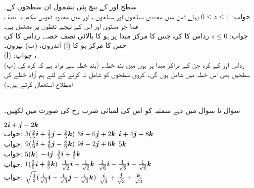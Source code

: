 سطح  اور  کے بیچ پٹی بشمول ان سطحوں کے۔\\
جواب:\quad
$0\le z\le 1$
پہلے ثمن میں محددی سطحوں اور سطحوں ،  اور  میں محدود ٹھوس مکعب۔
نصف فضا جو مستوی  اور اس کے نیچے  نقطوں پر مشتمل ہے۔ \\
جواب:\quad
$z\le 0$
رداس  کا کرہ جس کا مرکز مبدا پر ہو کا بالائی نصف حصہ۔
رداس  کا کرہ جس کا مرکز  ہو کا (ا) اندرون، (ب) بیرون۔\\
جواب:\quad
(ا) ، \\
(ب) 
رداس  اور  کے کرہ جن کے مراکز مبدا پر ہوں میں بند خطہ۔ (بند خطہ سے مراد ہے کہ کرہ کی سطحیں بھی اس خطہ میں شامل ہوں گی۔ کروی سطحوں کو شامل نہ کرنے کے لئے ہم آزاد خطے کی اصطلاح استعمال کرتے ہیں۔)

\\
سوال  تا سوال  میں دیے سمتیہ کو اس کی لمبائی ضرب رخ کی صورت میں لکھیں۔

$2{\boldsymbol{i}}+{\boldsymbol{j}}-2{\boldsymbol{k}}$\\
جواب:\quad
$3(\tfrac{2}{3}{\boldsymbol{i}}+\tfrac{1}{3}{\boldsymbol{j}}-\tfrac{2}{3}{\boldsymbol{k}})$
$3{\boldsymbol{i}}-6{\boldsymbol{j}}+2{\boldsymbol{k}}$
${\boldsymbol{i}}+4{\boldsymbol{j}}-8{\boldsymbol{k}}$\\
جواب:\quad
$9(\tfrac{1}{9}{\boldsymbol{i}}+\tfrac{4}{9}{\boldsymbol{j}}-\tfrac{8}{9}{\boldsymbol{k}})$
$9{\boldsymbol{i}}-2{\boldsymbol{j}}+6{\boldsymbol{k}}$
$5{\boldsymbol{k}}$\\
جواب:\quad
$5({\boldsymbol{k}})$
$-4{\boldsymbol{j}}$
$\tfrac{3}{5}{\boldsymbol{i}}+\tfrac{4}{5}{\boldsymbol{k}}$\\
جواب:\quad
$1(\tfrac{3}{5}{\boldsymbol{i}}+\tfrac{4}{5}{\boldsymbol{k}})$
$\tfrac{1}{\sqrt{2}}{\boldsymbol{i}}-\tfrac{1}{\sqrt{2}}{\boldsymbol{k}}$
$\tfrac{1}{\sqrt{6}}{\boldsymbol{i}}-\tfrac{1}{\sqrt{6}}{\boldsymbol{i}}-\tfrac{1}{\sqrt{6}}{\boldsymbol{k}}$\\
جواب:\quad
$\sqrt{\tfrac{1}{2}}(\tfrac{1}{\sqrt{3}}{\boldsymbol{i}}-\tfrac{1}{\sqrt{3}}{\boldsymbol{j}}-\tfrac{1}{\sqrt{3}}{\boldsymbol{k}})$
$\tfrac{{\boldsymbol{i}}}{\sqrt{3}}+\tfrac{{\boldsymbol{j}}}{\sqrt{3}}+\tfrac{{\boldsymbol{k}}}{\sqrt{3}}$

